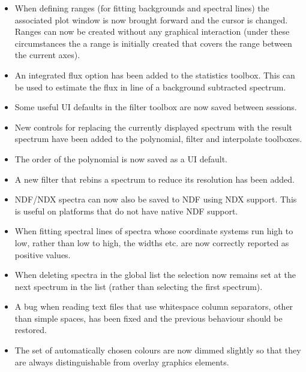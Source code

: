 \documentclass[twoside,11pt]{article}
\renewcommand{\_}{\texttt{\symbol{95}}}
\begin{document}
\begin{itemize}

\item When defining ranges (for fitting backgrounds and spectral lines) the
associated plot window is now brought forward and the cursor is changed.
Ranges can now be created without any graphical interaction (under these
circumstances the a range is initially created that covers the range between
the current axes).

\item An integrated flux option has been added to the statistics toolbox.
This can be used to estimate the flux in line of a background subtracted
spectrum.

\item Some useful UI defaults in the filter toolbox are now saved between
sessions.
   
\item New controls for replacing the currently displayed spectrum with
the result spectrum have been added to the polynomial, filter and interpolate 
toolboxes.

\item The order of the polynomial is now saved as a UI default.

\item A new filter that rebins a spectrum to reduce its resolution has been
added.

\item NDF/NDX spectra can now also be saved to NDF using NDX support. This is
useful on platforms that do not have native NDF support.
   
\item When fitting spectral lines of spectra whose coordinate systems run
high to low, rather than low to high, the widths etc. are now correctly
reported as positive values.

\item When deleting spectra in the global list the selection now remains
set at the next spectrum in the list (rather than selecting the
first spectrum).

\item A bug when reading text files that use whitespace column separators,
other than simple spaces, has been fixed and the previous behaviour
should be restored.

\item The set of automatically chosen colours are now dimmed slightly so that
they are always distinguishable from overlay graphics elements.


\end{itemize}
\end{document}
